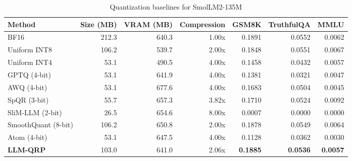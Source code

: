 \begin{table}[htbp]
  \centering
  \small
  \caption{Quantization baselines for SmolLM2-135M}
  \label{tab:bench_SmolLM2_135M}
  \begin{tabular}{lrrrrrr}
    \toprule
    \textbf{Method} & \textbf{Size (MB)} & \textbf{VRAM (MB)} & \textbf{Compression} & \textbf{GSM8K} & \textbf{TruthfulQA} & \textbf{MMLU} \\
    \midrule
    BF16 & 212.3 & 640.3 & 1.00x & 0.1891 & 0.0552 & 0.0062 \\
    Uniform INT8 & 106.2 & 539.7 & 2.00x & 0.1848 & 0.0551 & 0.0067 \\
    Uniform INT4 & 53.1 & 490.5 & 4.00x & 0.1458 & 0.0432 & 0.0057 \\
    GPTQ (4-bit) & 53.1 & 641.9 & 4.00x & 0.1381 & 0.0321 & 0.0047 \\
    AWQ (4-bit) & 53.1 & 677.6 & 4.00x & 0.1683 & 0.0504 & 0.0045 \\
    SpQR (3-bit) & 55.7 & 657.3 & 3.82x & 0.1710 & 0.0524 & 0.0092 \\
    SliM-LLM (2-bit) & 26.5 & 654.6 & 8.00x & 0.0007 & 0.0000 & 0.0000 \\
    SmoothQuant (8-bit) & 106.2 & 650.8 & 2.00x & 0.1878 & 0.0549 & 0.0064 \\
    Atom (4-bit) & 53.1 & 647.5 & 4.00x & 0.1128 & 0.0362 & 0.0030 \\
    \midrule
    \textbf{LLM-QRP} & 103.0 & 641.0 & 2.06x & \textbf{0.1885} & \textbf{0.0536} & \textbf{0.0057} \\
    \bottomrule
  \end{tabular}
\end{table}

